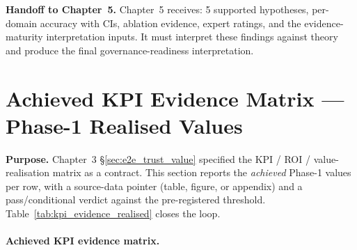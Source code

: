 \noindent\textbf{Handoff to Chapter~5.} Chapter~5 receives: 5 supported hypotheses, per-domain accuracy with CIs, ablation evidence, expert ratings, and the evidence-maturity interpretation inputs. It must interpret these findings against theory and produce the final governance-readiness interpretation.


\section{Achieved KPI Evidence Matrix --- Phase-1 Realised Values}
\label{sec:achieved_kpi_evidence}

\noindent\textbf{Purpose.} Chapter~3 \S\ref{sec:e2e_trust_value}
specified the KPI / ROI / value-realisation matrix as a contract. This
section reports the \emph{achieved} Phase-1 values per row, with a
source-data pointer (table, figure, or appendix) and a pass/conditional
verdict against the pre-registered threshold.
Table~\ref{tab:kpi_evidence_realised} closes the loop.

\paragraph{Achieved KPI evidence matrix.}


